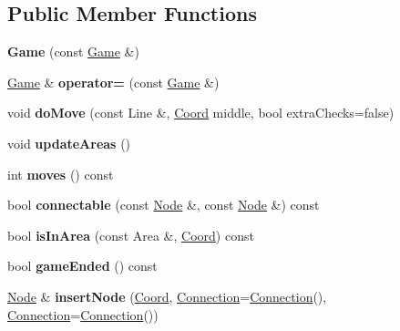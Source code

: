 \subsection*{Public Member Functions}
\begin{DoxyCompactItemize}
\item 
\hypertarget{classGame_aa79443880de5f26387c2a1c70c8c1aae}{{\bfseries Game} (const \hyperlink{classGame}{Game} \&)}\label{classGame_aa79443880de5f26387c2a1c70c8c1aae}

\item 
\hypertarget{classGame_aec1439ca4c76f4a002c235134d590158}{\hyperlink{classGame}{Game} \& {\bfseries operator=} (const \hyperlink{classGame}{Game} \&)}\label{classGame_aec1439ca4c76f4a002c235134d590158}

\item 
\hypertarget{classGame_a23882a4a63f1ea6c17bc6330440ff6f4}{void {\bfseries do\+Move} (const Line \&, \hyperlink{structCoord}{Coord} middle, bool extra\+Checks=false)}\label{classGame_a23882a4a63f1ea6c17bc6330440ff6f4}

\item 
\hypertarget{classGame_ac0652dbca9ce754f465cee5a81f508ae}{void {\bfseries update\+Areas} ()}\label{classGame_ac0652dbca9ce754f465cee5a81f508ae}

\item 
\hypertarget{classGame_a6134468ea7bb0bd23cc2b03a5f1a7e7c}{int {\bfseries moves} () const }\label{classGame_a6134468ea7bb0bd23cc2b03a5f1a7e7c}

\item 
\hypertarget{classGame_aa82304a9d084304f05ef8d8a6eeb732a}{bool {\bfseries connectable} (const \hyperlink{classNode}{Node} \&, const \hyperlink{classNode}{Node} \&) const }\label{classGame_aa82304a9d084304f05ef8d8a6eeb732a}

\item 
\hypertarget{classGame_a2c5aa5c26eb65e3f992701ac0408393e}{bool {\bfseries is\+In\+Area} (const Area \&, \hyperlink{structCoord}{Coord}) const }\label{classGame_a2c5aa5c26eb65e3f992701ac0408393e}

\item 
\hypertarget{classGame_a73b99aad84bf161b64ad012173528cfa}{bool {\bfseries game\+Ended} () const }\label{classGame_a73b99aad84bf161b64ad012173528cfa}

\item 
\hypertarget{classGame_ad377f36ff3fe304f6905f05427aa1ab2}{\hyperlink{classNode}{Node} \& {\bfseries insert\+Node} (\hyperlink{structCoord}{Coord}, \hyperlink{structConnection}{Connection}=\hyperlink{structConnection}{Connection}(), \hyperlink{structConnection}{Connection}=\hyperlink{structConnection}{Connection}())}\label{classGame_ad377f36ff3fe304f6905f05427aa1ab2}


\end{DoxyCompactItemize}
